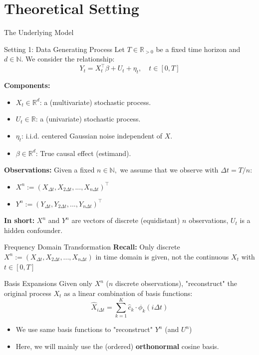 \section{Theoretical Setting}

\begin{frame}{The Underlying Model}
    \begin{block}{Setting 1: Data Generating Process}
        Let $T \in \mathbb{R}_{>0}$ be a fixed time horizon and $d \in \mathbb{N}$. We consider the relationship:
        \begin{equation}
            Y_t = X_t^\top \beta + U_t + \eta_t, \quad t \in [0,T]
        \end{equation}
    \end{block}
    {\small \textbf{Components:}
    \begin{itemize}
        \item \textbf{$X_t \in \mathbb{R}^d$}: a (multivariate) stochastic process.
        \item \textbf{$U_t \in \mathbb{R}$}: a (univariate) stochastic process.
        \item \textbf{$\eta_t$}: i.i.d. centered Gaussian noise independent of $X$.
        \item \textbf{$\beta \in \mathbb{R}^d$}: True causal effect (estimand).
    \end{itemize}
    \textbf{Observations:}
    Given a fixed $n \in \mathbb{N},$ we assume that we observe with $\Delta t = T/n$:
    \begin{itemize}
        \item $X^n := (X_{\Delta t}, X_{2\Delta t}, ..., X_{n\Delta t})^\top$
        \item $Y^n := (Y_{\Delta t}, Y_{2 \Delta t}, ..., Y_{n \Delta t})^\top$
    \end{itemize}}

    \textbf{In short:} $X^n$ and $Y^n$ are vectors of discrete (equidistant) $n$ observations, $U_t$ is a hidden confounder.
\end{frame}

\begin{frame}{Frequency Domain Transformation}
    \textbf{Recall:}
    Only discrete $X^n := (X_{\Delta t}, X_{2\Delta t}, ..., X_{n\Delta t})$ in time domain is given, not the continuous $X_t$ with $t \in [0, T]$
    \begin{block}{Basis Expansions}
        Given only $X^n$ ($n$ discrete observations), "reconstruct" the original process $X_t$ as a linear combination of basis functions:
        \begin{equation}
            \hat X_{i \Delta t} = \sum_{k = 1}^{K}\hat c_k \cdot \phi_k(i\Delta t)
        \end{equation}
    \end{block}
    \begin{itemize}
        \item We use same basis functions to "reconstruct" $Y^n$ (and $U^n$)
        \item Here, we will mainly use the (ordered) \textbf{orthonormal} cosine basis.
    \end{itemize}
\end{frame}


